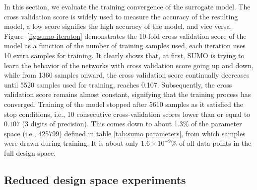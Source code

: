 In this section, we evaluate the training convergence of
the surrogate model. The cross validation score is widely used to measure the accuracy of the resulting model, a low score signifies the high accuracy of the model, and vice versa. Figure~\ref{fig:sumo-iteraton} demonstrates the 10-fold cross validation score of the model as a function of the number of training samples used, each iteration uses 10 extra samples for training.  %
It clearly shows that, at first, SUMO is trying to learn the behavior of the networks with cross validation score going up and down, while from 1360 samples onward, the cross validation score continually decreases until 5520 samples used for training, reaches 0.107. Subsequently, the cross validation score remains almost constant, signifying that the training process has converged.  Training of the model stopped after 5610 samples as it satisfied the stop conditions, i.e., 10 consecutive cross-validation scores lower than or equal to $0.107$ (3 digits of precision). This comes down to about 1.3\% of the parameter space (i.e., 425799) defined in table \ref{tab:sumo parameters}, from which samples were drawn during training. It is about only $1.6 \times 10^{-9}\%$ of all data points in the full design space.






\subsection{Reduced design space experiments}


